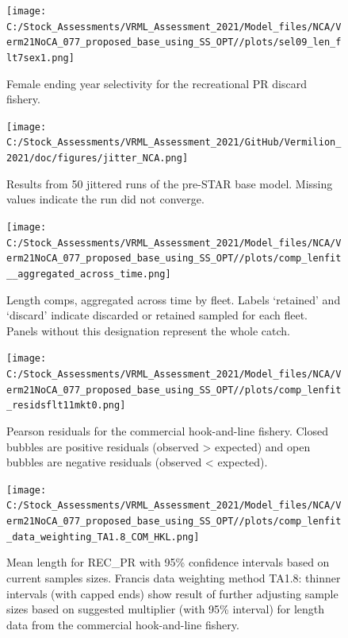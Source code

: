 \documentclass[
  english,
  a4paper,
]{article}
\begin{document}
\begin{figure}
\centering
\texttt{[image: C:/Stock\_Assessments/VRML\_Assessment\_2021/Model\_files/NCA/Verm21NoCA\_077\_proposed\_base\_using\_SS\_OPT//plots/sel09\_len\_flt7sex1.png]}
\caption{Female ending year selectivity for the recreational PR discard fishery.\label{fig:endyr-selex-REC-PR-DIS}}
\end{figure}

\FloatBarrier

\begin{figure}
\centering
\texttt{[image: C:/Stock\_Assessments/VRML\_Assessment\_2021/GitHub/Vermilion\_2021/doc/figures/jitter\_NCA.png]}
\caption{Results from 50 jittered runs of the pre-STAR base model. Missing values indicate the run did not converge.\label{fig:jitter}}
\end{figure}

\clearpage
\FloatBarrier

\FloatBarrier

\begin{figure}
\centering
\texttt{[image: C:/Stock\_Assessments/VRML\_Assessment\_2021/Model\_files/NCA/Verm21NoCA\_077\_proposed\_base\_using\_SS\_OPT//plots/comp\_lenfit\_\_aggregated\_across\_time.png]}
\caption{Length comps, aggregated across time by fleet.
Labels `retained' and `discard' indicate discarded or retained sampled for each fleet. Panels without this designation represent the whole catch.\label{fig:lenfits-all}}
\end{figure}

\FloatBarrier

\begin{figure}
\centering
\texttt{[image: C:/Stock\_Assessments/VRML\_Assessment\_2021/Model\_files/NCA/Verm21NoCA\_077\_proposed\_base\_using\_SS\_OPT//plots/comp\_lenfit\_residsflt11mkt0.png]}
\caption{Pearson residuals for the commercial hook-and-line fishery. Closed bubbles are positive residuals (observed \textgreater{} expected) and open bubbles are negative residuals (observed \textless{} expected).\label{fig:len-pearson-COM-HKL}}
\end{figure}

\begin{figure}
\centering
\texttt{[image: C:/Stock\_Assessments/VRML\_Assessment\_2021/Model\_files/NCA/Verm21NoCA\_077\_proposed\_base\_using\_SS\_OPT//plots/comp\_lenfit\_data\_weighting\_TA1.8\_COM\_HKL.png]}
\caption{Mean length for REC\_PR with 95\% confidence intervals based on current samples sizes. Francis data weighting method TA1.8: thinner intervals (with capped ends) show result of further adjusting sample sizes based on suggested multiplier (with 95\% interval) for length data from the commercial hook-and-line fishery.\label{fig:mean-len-fit-COM-HKL}}
\end{figure}
\end{document}
